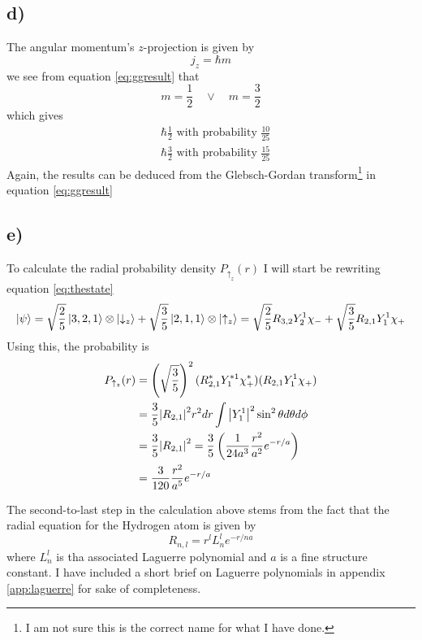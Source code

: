 \documentclass[]{article}
\begin{document}
\subsection*{d)}

The angular momentum's $z$-projection is given by
\begin{equation*}
j_z = \hbar m
\end{equation*}
we see from equation \ref{eq:ggresult} that
\begin{equation*}
m=\frac{1}{2} \quad \lor \quad m=\frac{3}{2}
\end{equation*}
which gives
\begin{align*}
&\hbar\frac{1}{2} \text{ with probability } \frac{10}{25} \\
&\hbar\frac{3}{2} \text{ with probability } \frac{15}{25}
\end{align*}
Again, the results can be deduced from the Glebsch-Gordan transform\footnote{I am not sure this is the correct name for what I have done.} in equation \ref{eq:ggresult}

\subsection*{e)}

To calculate the radial probability density $P_{\uparrow_z}(r)$ I will start be rewriting equation \ref{eq:thestate}
\begin{equation*}
\ket{\psi} = \sqrt{\frac{2}{5}}\ket{3,2,1}\otimes\ket{\downarrow_z}+\sqrt{\frac{3}{5}}\ket{2,1,1}\otimes\ket{\uparrow_z}
= \sqrt{\frac{2}{5}}R_{3,2}Y_2^1\chi_-+\sqrt{\frac{3}{5}}R_{2,1}Y_1^1\chi_+
\end{equation*}
Using this, the probability is
\begin{align*}
P_{\uparrow_z}(r)&=\left(\sqrt{\frac{3}{5}}\right)^2(R_{2,1}^*Y_1^{*1}\chi_+^*)(R_{2,1}Y_1^1\chi_+) \\
&=\frac{3}{5}\abs{R_{2,1}}^2 r^2 dr \int \abs{Y_1^1}^2 \sin^2{\theta}d\theta d\phi \\
&=\frac{3}{5}\abs{R_{2,1}}^2 = \frac{3}{5}\left(\frac{1}{24a^3}\frac{r^2}{a^2}e^{-r/a} \right) \\
&= \frac{3}{120}\frac{r^2}{a^5}e^{-r/a}
\end{align*}

The second-to-last step in the calculation above stems from the fact that the radial equation for the Hydrogen atom is given by 
\begin{equation}
R_{n,l} = r^lL_n^le^{-r/na}
\end{equation}
where $L_n^l$ is tha associated Laguerre polynomial and $a$ is a fine structure constant. I have included a short brief on Laguerre polynomials in appendix \ref{app:laguerre} for sake of completeness.
\end{document}
